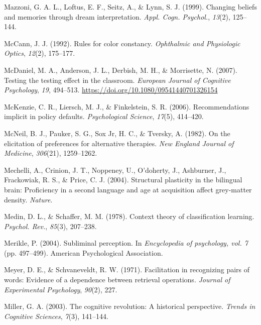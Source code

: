 \documentclass[
]{krantz}
\newlength{\cslhangindent}
\newlength{\cslentryspacingunit} %
\newenvironment{CSLReferences}[2] %
 {%
  \setlength{\parindent}{0pt}
  \ifodd #1
  \let\oldpar\par
  \def\par{\hangindent=\cslhangindent\oldpar}
  \fi
  \setlength{\parskip}{#2\cslentryspacingunit}
 }%
 {}
\begin{document}
\begin{CSLReferences}{1}{0}
\leavevmode{}%
Mazzoni, G. A. L., Loftus, E. F., Seitz, A., \& Lynn, S. J. (1999). Changing beliefs and memories through dream interpretation. \emph{Appl. Cogn. Psychol.}, \emph{13}(2), 125--144.

\leavevmode{}%
McCann, J. J. (1992). Rules for color constancy. \emph{Ophthalmic and Physiologic Optics}, \emph{12}(2), 175--177.

\leavevmode{}%
McDaniel, M. A., Anderson, J. L., Derbish, M. H., \& Morrisette, N. (2007). Testing the testing effect in the classroom. \emph{European Journal of Cognitive Psychology}, \emph{19}, 494--513. \url{https://doi.org/10.1080/09541440701326154}

\leavevmode{}%
McKenzie, C. R., Liersch, M. J., \& Finkelstein, S. R. (2006). Recommendations implicit in policy defaults. \emph{Psychological Science}, \emph{17}(5), 414--420.

\leavevmode{}%
McNeil, B. J., Pauker, S. G., Sox Jr, H. C., \& Tversky, A. (1982). On the elicitation of preferences for alternative therapies. \emph{New England Journal of Medicine}, \emph{306}(21), 1259--1262.

\leavevmode{}%
Mechelli, A., Crinion, J. T., Noppeney, U., O'doherty, J., Ashburner, J., Frackowiak, R. S., \& Price, C. J. (2004). Structural plasticity in the bilingual brain: Proficiency in a second language and age at acquisition affect grey-matter density. \emph{Nature}.

\leavevmode{}%
Medin, D. L., \& Schaffer, M. M. (1978). Context theory of classification learning. \emph{Psychol. Rev.}, \emph{85}(3), 207--238.

\leavevmode{}%
Merikle, P. (2004). Subliminal perception. In \emph{Encyclopedia of psychology, vol. 7} (pp. 497--499). American Psychological Association.

\leavevmode{}%
Meyer, D. E., \& Schvaneveldt, R. W. (1971). Facilitation in recognizing pairs of words: Evidence of a dependence between retrieval operations. \emph{Journal of Experimental Psychology}, \emph{90}(2), 227.

\leavevmode{}%
Miller, G. A. (2003). The cognitive revolution: A historical perspective. \emph{Trends in Cognitive Sciences}, \emph{7}(3), 141--144.


\end{CSLReferences}
\end{document}
